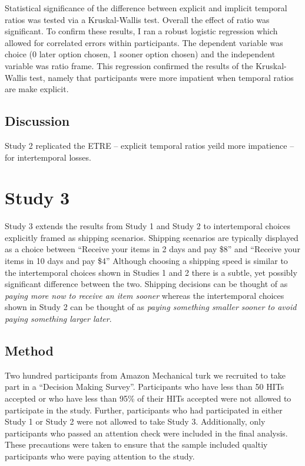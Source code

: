 \documentclass[]{article}
\begin{document}
Statistical significance of  the difference between explicit and implicit temporal ratios was tested via a Kruskal-Wallis test.
Overall the effect of ratio was significant. 
To confirm these results, I ran a robust logistic regression which allowed for correlated errors within participants.
The dependent variable was choice (0 later option chosen, 1 sooner option chosen) and the independent variable was ratio frame. 
This regression confirmed the results of the Kruskal-Wallis test, namely that participants were more impatient when temporal ratios are make explicit. 

\subsection{Discussion}

Study 2 replicated the ETRE -- explicit temporal ratios yeild more impatience -- for intertemporal losses. 


\section{Study 3}
Study 3 extends the results from Study 1 and Study 2 to intertemporal choices explicitly framed as shipping scenarios.
Shipping scenarios are typically displayed as a choice between ``Receive your items in 2 days and pay \$8'' and ``Receive your items in 10 days and pay \$4''
Although choosing a shipping speed is similar to the intertemporal choices shown in Studies 1 and 2 there is a subtle, yet possibly significant difference between the two.
Shipping decisions can be thought of as \textit{paying more now to receive an item sooner} whereas the intertemporal choices shown in Study 2 can be thought of as \textit{paying something smaller sooner to avoid paying something larger later}.

\subsection{Method}
Two hundred participants from Amazon Mechanical turk we recruited to take part in a ``Decision Making Survey''. 
Participants who have less than 50 HITs accepted or  who have less than 95\% of their HITs accepted were not allowed to participate in the study. 
Further, participants who had participated in either Study 1 or Study 2 were not allowed to take Study 3. 
Additionally, only participants who passed an attention check were included in the final analysis.
These precautions were taken to ensure that the sample included qualtiy participants who were paying attention to the study. 
\end{document}

